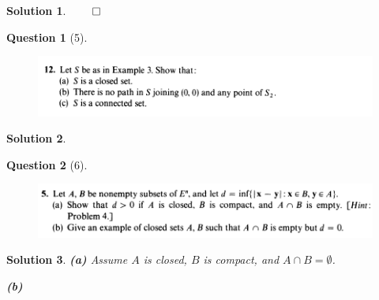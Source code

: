 \documentclass{article} %
\theoremstyle{quest}
\newtheorem*{question}{Question}
\newtheorem*{solution}{Solution}
\begin{document}
\begin{solution}
\hfill $\qed$
 
\end{solution}

\newpage

\begin{question}[5]
\hfill
\begin{figure}[h!]
  \centering
    \includegraphics[width=1\textwidth]{MA-2-27-12.png}
\end{figure}
\end{question}
\begin{solution} 
 
 
\end{solution}

\newpage

\begin{question}[6]
\hfill
\begin{figure}[h!]
  \centering
    \includegraphics[width=1\textwidth]{MA-2-28-5.png}
\end{figure}
\end{question}
\begin{solution} 
\textbf{(a)} Assume $A$ is closed, $B$ is compact, and $A \cap B = \emptyset$.  

\bigskip

\textbf{(b)}
 
\end{solution}
\newpage
\end{document}
